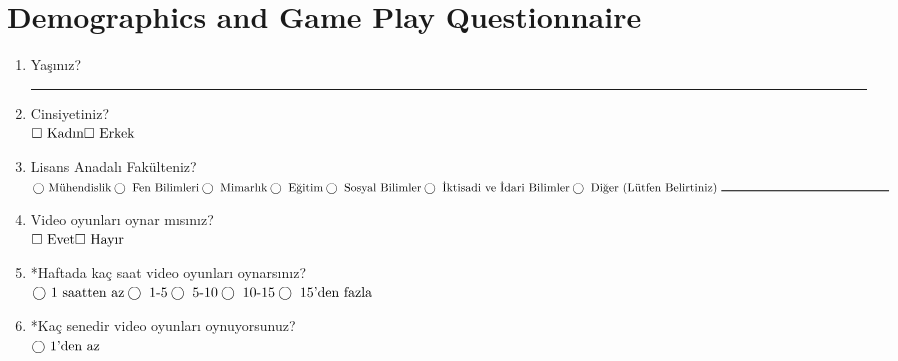 \chapter {Demographics and Game Play Questionnaire}
\label {chp:appendixB}

\begin{enumerate}
\item Yaşınız?\\
	\rule{5cm}{1pt}
\item Cinsiyetiniz?\\
	\begin{math}
	\square \mbox{ Kadın} \\
	\square \mbox{ Erkek}
	\end{math}
\item Lisans Anadalı Fakülteniz?\\
	\begin{math}
	\bigcirc \mbox{ Mühendislik}\\
	\bigcirc \mbox{ Fen Bilimleri}\\
	\bigcirc \mbox{ Mimarlık}\\
	\bigcirc \mbox{ Eğitim}\\
	\bigcirc \mbox{ Sosyal Bilimler}\\
	\bigcirc \mbox{ İktisadi ve İdari Bilimler}\\
	\bigcirc \mbox{ Diğer (Lütfen Belirtiniz) }\rule{5cm}{1pt}
	\end{math}
\item Video oyunları oynar mısınız?\\
	\begin{math}
	\square \mbox{ Evet} \\
	\square \mbox{ Hayır}
	\end{math}
\item *Haftada kaç saat video oyunları oynarsınız?\\
	\begin{math}
	\bigcirc \mbox{ 1 saatten az}\\
	\bigcirc \mbox{ 1-5}\\
	\bigcirc \mbox{ 5-10}\\
	\bigcirc \mbox{ 10-15}\\
	\bigcirc \mbox{ 15'den fazla}\\
	\end{math}
\item *Kaç senedir video oyunları oynuyorsunuz?\\
	\begin{math}
	\bigcirc \mbox{ 1'den az}\\

\end{math}
\end{enumerate}
